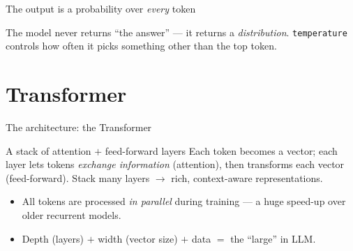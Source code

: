 \documentclass[aspectratio=169,11pt]{beamer}
\begin{document}
\begin{frame}{The output is a probability over \emph{every} token}
  \begin{center}
  \end{center}
  {\footnotesize The model never returns ``the answer'' --- it returns a \emph{distribution}. \texttt{temperature} controls how often it picks something other than the top token.}
\end{frame}

\section{Transformer}
\begin{frame}{The architecture: the Transformer}
  \begin{block}{A stack of attention $+$ feed-forward layers}
    Each token becomes a vector; each layer lets tokens \emph{exchange information} (attention), then transforms each vector (feed-forward). Stack many layers $\to$ rich, context-aware representations.
  \end{block}
  \begin{itemize}
    \item All tokens are processed \emph{in parallel} during training --- a huge speed-up over older recurrent models.
    \item Depth (layers) $+$ width (vector size) $+$ data $=$ the ``large'' in LLM.
  \end{itemize}
\end{frame}
\end{document}
